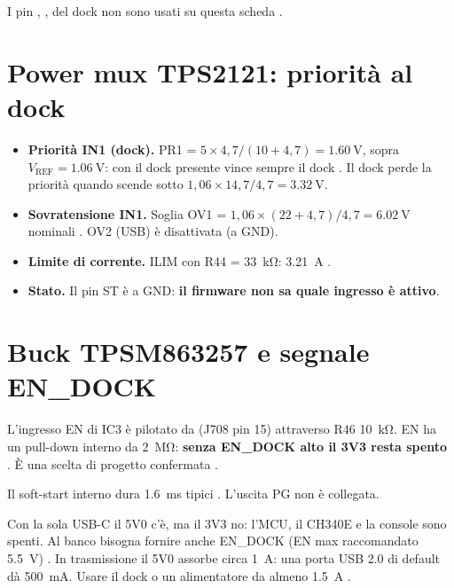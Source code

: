 I pin , ,  del dock non sono usati su questa scheda .

\section{Power mux TPS2121: priorità al dock}
\begin{itemize}
\item \textbf{Priorità IN1 (dock).} PR1 = $5 \times 4{,}7/(10+4{,}7) = \SI{1.60}{\volt}$, sopra $V_\text{REF} = \SI{1.06}{\volt}$: con il dock presente vince sempre il dock . Il dock perde la priorità quando scende sotto $1{,}06 \times 14{,}7/4{,}7 = \SI{3.32}{\volt}$.
\item \textbf{Sovratensione IN1.} Soglia OV1 = $1{,}06 \times (22+4{,}7)/4{,}7 = \SI{6.02}{\volt}$ nominali . OV2 (USB) è disattivata (a GND).
\item \textbf{Limite di corrente.} ILIM con R44 = \SI{33}{\kilo\ohm}: \SI{3.21}{\ampere} .
\item \textbf{Stato.} Il pin ST è a GND: \textbf{il firmware non sa quale ingresso è attivo}.
\end{itemize}

\section{Buck TPSM863257 e segnale EN\_DOCK}
L'ingresso EN di IC3 è pilotato da  (J708 pin 15) attraverso R46 \SI{10}{\kilo\ohm}. EN ha un pull-down interno da \SI{2}{\mega\ohm}: \textbf{senza EN\_DOCK alto il 3V3 resta spento} . È una scelta di progetto confermata .

Il soft-start interno dura \SI{1.6}{\milli\second} tipici . L'uscita PG non è collegata.

\begin{attenzione}
Con la sola USB-C il 5V0 c'è, ma il 3V3 no: l'MCU, il CH340E e la console sono spenti. Al banco bisogna fornire anche EN\_DOCK (EN max raccomandato \SI{5.5}{\volt}) . In trasmissione il 5V0 assorbe circa \SI{1}{\ampere}: una porta USB 2.0 di default dà \SI{500}{\milli\ampere}. Usare il dock o un alimentatore da almeno \SI{1.5}{\ampere} .
\end{attenzione}

